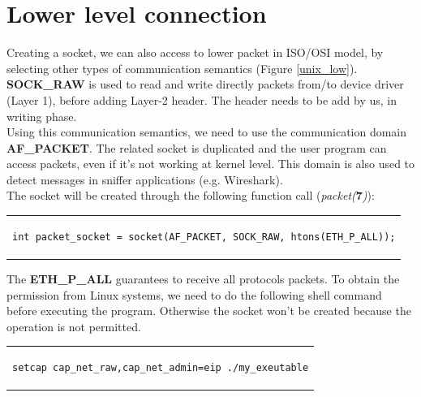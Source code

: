 \section{Lower level connection}
Creating a socket, we can also access to lower packet in ISO/OSI model, by selecting other types of communication semantics (Figure \ref{unix_low}). \textbf{SOCK\_RAW} is used to read and write directly packets from/to device driver (Layer 1), before adding Layer-2 header. The header needs to be add by us, in writing phase.\\
Using this communication semantics, we need to use the communication domain \textbf{AF\_PACKET}. The related socket is duplicated and the user program can access packets, even if it's not working at kernel level. This domain is also used to detect messages in sniffer applications (e.g. Wireshark).\\
The socket will be created through the following function call (\textit{packet(}\textbf{7}\textit{)}):
\begin{center}
\begin{tabular}{c}
\begin{lstlisting}[linewidth=340pt, basicstyle=\footnotesize\sffamily,]
int packet_socket = socket(AF_PACKET, SOCK_RAW, htons(ETH_P_ALL));
\end{lstlisting}
\end{tabular}
\end{center}
The \textbf{ETH\_P\_ALL} guarantees to receive all protocols packets.
To obtain the permission from Linux systems, we need to do the following shell command before executing the program. Otherwise the socket won't be created because the operation is not permitted.
\begin{center}
\begin{tabular}{c}
\begin{lstlisting}[linewidth=270pt, basicstyle=\footnotesize\sffamily,]
setcap cap_net_raw,cap_net_admin=eip ./my_exeutable
\end{lstlisting}
\end{tabular}
\end{center}

